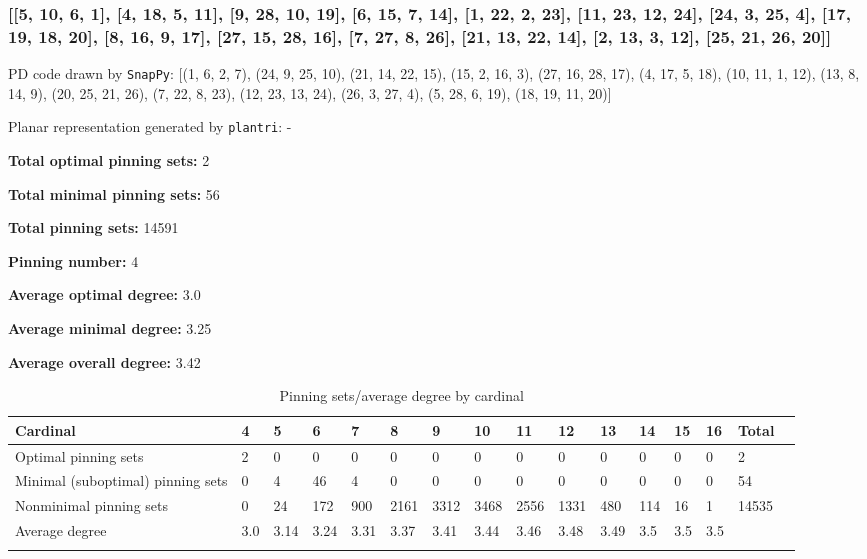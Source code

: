 \documentclass{article}%
\begin{document}
\newpage

\subsubsection{[[5, 10, 6, 1], [4, 18, 5, 11], [9, 28, 10, 19], [6, 15, 7, 14], [1, 22, 2, 23], [11, 23, 12, 24], [24, 3, 25, 4], [17, 19, 18, 20], [8, 16, 9, 17], [27, 15, 28, 16], [7, 27, 8, 26], [21, 13, 22, 14], [2, 13, 3, 12], [25, 21, 26, 20]]}

{\small\noindent PD code drawn by \texttt{SnapPy}: [(1, 6, 2, 7), (24, 9, 25, 10), (21, 14, 22, 15), (15, 2, 16, 3), (27, 16, 28, 17), (4, 17, 5, 18), (10, 11, 1, 12), (13, 8, 14, 9), (20, 25, 21, 26), (7, 22, 8, 23), (12, 23, 13, 24), (26, 3, 27, 4), (5, 28, 6, 19), (18, 19, 11, 20)]}

{\small\noindent Planar representation generated by \texttt{plantri}: -}

\begin{multicols}{2}
{\normalsize \noindent\textbf{Total optimal pinning sets:} 2

\noindent\textbf{Total minimal pinning sets:} 56

\noindent\textbf{Total pinning sets:} 14591

\noindent\textbf{Pinning number:} 4

}
\columnbreak

{\normalsize \noindent\textbf{Average optimal degree:} 3.0

\noindent\textbf{Average minimal degree:} 3.25

\noindent\textbf{Average overall degree:} 3.42

}
\end{multicols}

\begin{table}[ht]
	\caption{Pinning sets/average degree by cardinal}
	\centering
	\renewcommand{\arraystretch}{1.5}
	\begin{tabularx}{\textwidth}{lXXXXXXXXXXXXXXX}
		\toprule
			Cardinal & 4 & 5 & 6 & 7 & 8 & 9 & 10 & 11 & 12 & 13 & 14 & 15 & 16 & Total\\
			\hline
			Optimal pinning sets & 2 & 0 & 0 & 0 & 0 & 0 & 0 & 0 & 0 & 0 & 0 & 0 & 0 & 2 \\
			Minimal (suboptimal) pinning sets & 0 & 4 & 46 & 4 & 0 & 0 & 0 & 0 & 0 & 0 & 0 & 0 & 0 & 54 \\
			Nonminimal pinning sets & 0 & 24 & 172 & 900 & 2161 & 3312 & 3468 & 2556 & 1331 & 480 & 114 & 16 & 1 & 14535 \\
			Average degree & 3.0 & 3.14 & 3.24 & 3.31 & 3.37 & 3.41 & 3.44 & 3.46 & 3.48 & 3.49 & 3.5 & 3.5 & 3.5 &  \\
		\bottomrule \\ 
	\end{tabularx}
\end{table}
\end{document}
